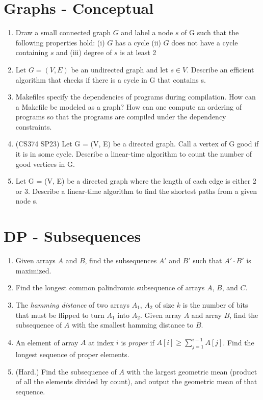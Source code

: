 \documentclass[fleqn]{article}
\begin{document}
\section{Graphs - Conceptual}
\begin{enumerate}
    \item Draw a small connected graph $G$ and label a node $s$ of G such that the following properties hold: (i) $G$ has a cycle (ii) $G$ does not have a cycle containing $s$ and (iii) degree of $s$ is at least 2

    \item Let $G = (V, E)$ be an undirected graph and let $s \in V$. Describe an efficient algorithm that checks if there is a cycle in G that contains s.

    \item Makefiles specify the dependencies of programs during compilation. How can a Makefile be modeled as a graph? How can one compute an ordering of programs so that the programs are compiled under the dependency constraints.

    \item  (CS374 SP23) Let G = (V, E) be a directed graph. Call a vertex of G good if it is in some cycle. Describe a linear-time algorithm to count the number of good vertices in G.

    \item Let G = (V, E) be a directed graph where the length of each edge is either 2 or 3. Describe a linear-time algorithm to find the shortest paths from a given node s.
    
\end{enumerate}

\section{DP - Subsequences}
\begin{enumerate}
    \item Given arrays $A$ and $B$, find the subsequences $A'$ and $B'$ such that $A' \cdot B'$ is maximized.
    \item Find the longest common palindromic subsequence of arrays $A$, $B$, and $C$.
    \item The \textit{hamming distance} of two arrays $A_1$, $A_2$ of size $k$ is the number of bits that must be flipped to turn $A_1$ into $A_2$. Given array $A$ and array $B$, find the subsequence of $A$ with the smallest hamming distance to $B$.
    \item An element of array $A$ at index $i$ is \textit{proper} if $A[i] \geq \sum_{j=1}^{i-1} A[j]$. Find the longest sequence of proper elements.
    \item (Hard.) Find the subsequence of $A$ with the largest geometric mean (product of all the elements divided by count), and output the geometric mean of that sequence. 
\end{enumerate}
\end{document}
